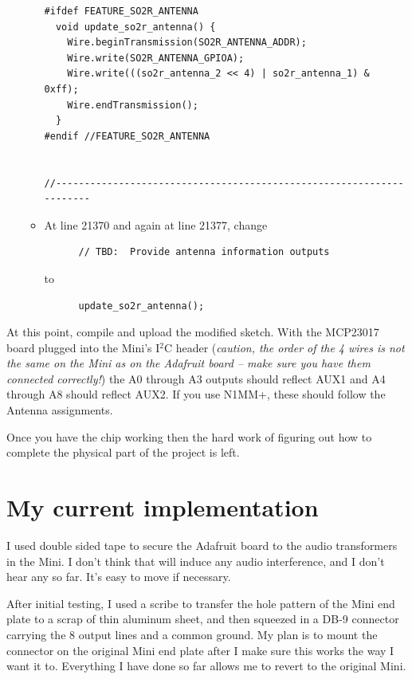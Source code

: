 \documentclass[12pt]{article}
\begin{document}
\begin{itemize}
\begin{itemize}
\begin{verbatim}
#ifdef FEATURE_SO2R_ANTENNA
  void update_so2r_antenna() {
    Wire.beginTransmission(SO2R_ANTENNA_ADDR);
    Wire.write(SO2R_ANTENNA_GPIOA);
    Wire.write(((so2r_antenna_2 << 4) | so2r_antenna_1) & 0xff);
    Wire.endTransmission();
  }
#endif //FEATURE_SO2R_ANTENNA


//---------------------------------------------------------------------
\end{verbatim}
\item
At line 21370 and again at line 21377, change
\begin{verbatim}
      // TBD:  Provide antenna information outputs
\end{verbatim}
to
\begin{verbatim}
      update_so2r_antenna();
\end{verbatim}
\end{itemize}
\end{itemize}

At this point, compile and upload the modified sketch. With the
MCP23017 board plugged into the Mini's I$^2$C header ({\em caution,
the order of the 4 wires is not the same on the Mini as on the
Adafruit board -- make sure you have them connected correctly!})
the A0 through A3 outputs should reflect AUX1 and A4 through A8 should
reflect AUX2. If you use N1MM+, these should follow the Antenna assignments.

Once you have the chip working then the hard work of figuring out how
to complete the physical part of the project is left.

\section{My current implementation}

I used double sided tape to secure the Adafruit board to the audio
transformers in the Mini.
I don't think that will 
induce any audio interference, and
I don't hear any so far. It's easy to move if necessary.

After initial testing, I
used a scribe to transfer the hole pattern of the Mini
end plate to a scrap of thin aluminum sheet, and then squeezed in a DB-9
connector carrying the 8 output lines and a common ground. My plan is to
mount the connector on the original Mini end plate after I make sure this
works the way I want it to. Everything I have done so far allows me to
revert to the original Mini.
\end{document}
